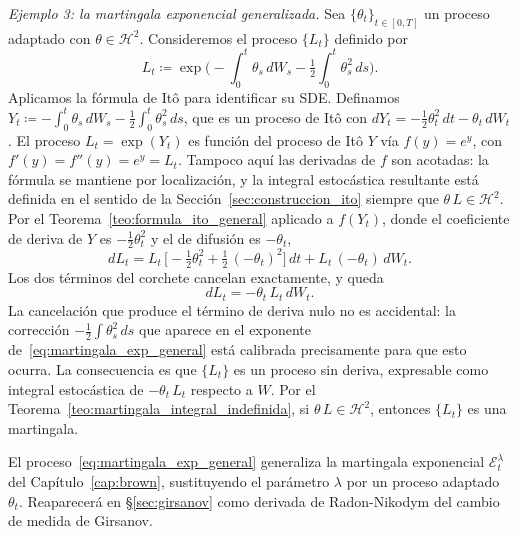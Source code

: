 \documentclass[11pt,a4paper,oneside]{report}
\theoremstyle{plain}
\theoremstyle{definition}
\theoremstyle{remark}
\newcommand{\1}{\mathbf{1}}
\newcommand{\eqdef}{\coloneqq}
\begin{document}
\medskip

\noindent\textit{Ejemplo 3: la martingala exponencial generalizada.}
Sea $\{\theta_t\}_{t \in [0, T]}$ un proceso adaptado con $\theta \in
\mathcal{H}^2$. Consideremos el proceso $\{L_t\}$ definido por
\begin{equation}\label{eq:martingala_exp_general}
  L_t \eqdef \exp\!\biggl(- \int_0^t \theta_s\, dW_s
                           - \tfrac{1}{2} \int_0^t \theta_s^2\, ds\biggr).
\end{equation}
Aplicamos la fórmula de Itô para identificar su SDE. Definamos $Y_t
\eqdef -\int_0^t \theta_s\, dW_s - \tfrac{1}{2} \int_0^t \theta_s^2\,
ds$, que es un proceso de Itô con $dY_t = -\tfrac{1}{2} \theta_t^2\,
dt - \theta_t\, dW_t$. El proceso $L_t = \exp(Y_t)$ es función del
proceso de Itô $Y$ vía $f(y) = e^y$, con $f'(y) = f''(y) = e^y = L_t$. Tampoco aquí las derivadas de $f$ son acotadas: la fórmula se mantiene por localización, y la integral estocástica resultante está definida en el sentido de la Sección~\ref{sec:construccion_ito} siempre que $\theta\, L \in \mathcal{H}^2$.
Por el Teorema~\ref{teo:formula_ito_general} aplicado a $f(Y_t)$, donde el coeficiente de deriva de $Y$ es $-\tfrac{1}{2}\theta_t^2$ y
el de difusión es $-\theta_t$,
\begin{equation*}
  dL_t = L_t\, \biggl[-\tfrac{1}{2}\theta_t^2 +
                       \tfrac{1}{2}\, (-\theta_t)^2\biggr]\, dt
        + L_t\, (-\theta_t)\, dW_t.
\end{equation*}
Los dos términos del corchete cancelan exactamente, y queda
\begin{equation}\label{eq:sde_martingala_exp}
  dL_t = -\theta_t\, L_t\, dW_t.
\end{equation}
La cancelación que produce el término de deriva nulo no es accidental:
la corrección $-\tfrac{1}{2}\int \theta_s^2\, ds$ que aparece en el
exponente de~\eqref{eq:martingala_exp_general} está calibrada
precisamente para que esto ocurra. La consecuencia es que $\{L_t\}$ es
un proceso sin deriva, expresable como integral estocástica de
$-\theta_t\, L_t$ respecto a $W$. Por el
Teorema~\ref{teo:martingala_integral_indefinida}, si $\theta\, L \in
\mathcal{H}^2$, entonces $\{L_t\}$ es una martingala.

El proceso~\eqref{eq:martingala_exp_general} generaliza la
martingala exponencial $\mathcal{E}_t^\lambda$ del
Capítulo~\ref{cap:brown}, sustituyendo el parámetro $\lambda$ por un
proceso adaptado $\theta_t$. Reaparecerá en
§\ref{sec:girsanov} como derivada de Radon-Nikodym del cambio
de medida de Girsanov.
\end{document}
